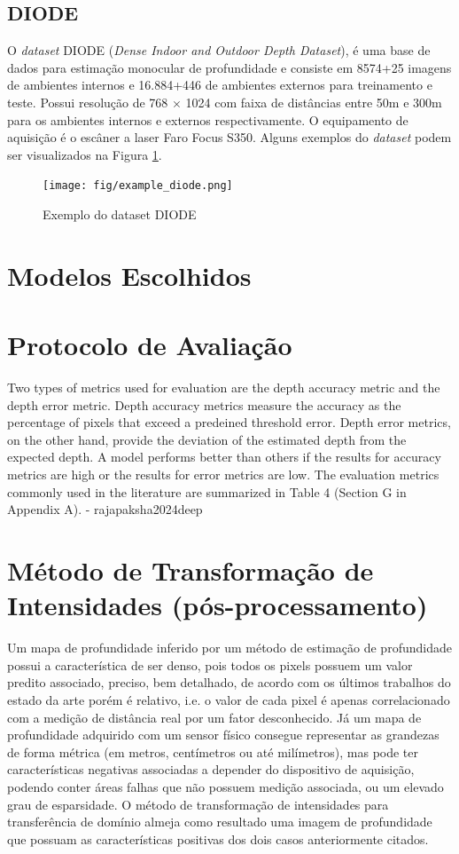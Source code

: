 \subsection{DIODE}

O \textit{dataset} DIODE (\textit{Dense Indoor and Outdoor Depth Dataset}), é uma base de dados para estimação monocular de profundidade e consiste em 8574+25 imagens de ambientes internos e 16.884+446 de ambientes externos para treinamento e teste. Possui resolução de 768 $\times$ 1024 com faixa de distâncias entre 50m e 300m para os ambientes internos e externos respectivamente. O equipamento de aquisição é o escâner a laser Faro Focus S350. Alguns exemplos do \textit{dataset} podem ser visualizados na Figura \ref{exdiode}.

\begin{figure}[h]
    \centering
    \texttt{[image: fig/example\_diode.png]}
    \caption{Exemplo do dataset DIODE}
    \label{exdiode}
\end{figure}

\section{Modelos Escolhidos}

\section{Protocolo de Avaliação}


Two types of metrics used for evaluation are the depth accuracy metric and the depth error metric. Depth accuracy
metrics measure the accuracy as the percentage of pixels that exceed a predeined threshold error. Depth error
metrics, on the other hand, provide the deviation of the estimated depth from the expected depth. A model
performs better than others if the results for accuracy metrics are high or the results for error metrics are low.
The evaluation metrics commonly used in the literature are summarized in Table 4 (Section G in Appendix A). - rajapaksha2024deep


\section{Método de Transformação de Intensidades (pós-processamento)}

Um mapa de profundidade inferido por um método de estimação de profundidade possui a característica de ser denso, pois todos os pixels possuem um valor predito associado, preciso, bem detalhado, de acordo com os últimos trabalhos do estado da arte porém é relativo, i.e. o valor de cada pixel é apenas correlacionado com a medição de distância real por um fator desconhecido. Já um mapa de profundidade adquirido com um sensor físico consegue representar as grandezas de forma métrica (em metros, centímetros ou até milímetros), mas pode ter características negativas associadas a depender do dispositivo de aquisição, podendo conter áreas falhas que não possuem medição associada, ou um elevado grau de esparsidade. O método de transformação de intensidades para transferência de domínio almeja como resultado uma imagem de profundidade que possuam as características positivas dos dois casos anteriormente citados. 

